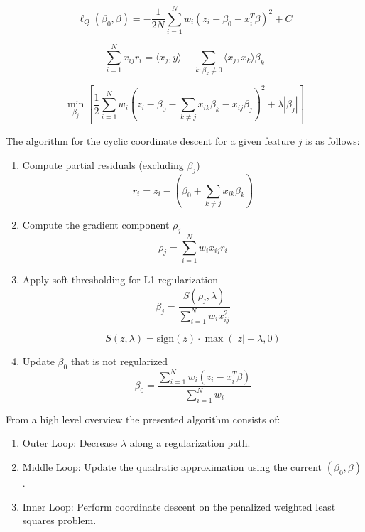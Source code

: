 \documentclass[12pt]{article}
\begin{document}
\begin{equation}\label{eq:quadratic-approximation}
\ell_Q(\beta_0, \beta) = -\frac{1}{2N} \sum_{i=1}^{N} w_i (z_i - \beta_0 - x_i^T \beta)^2 + C
\end{equation}


\begin{equation}\label{eq:covariance-update}
\sum_{i=1}^{N} x_{ij} r_i = \langle x_j, y \rangle - \sum_{k: \beta_k \neq 0} \langle x_j, x_k \rangle \beta_k
\end{equation}

\begin{equation}\label{eq:feature-minimization}
    \min_{\beta_j} \left[ \frac{1}{2} \sum_{i=1}^{N} w_i \left( z_i - \beta_0 - \sum_{k \neq j} x_{ik} \beta_k - x_{ij} \beta_j \right)^2 + \lambda |\beta_j| \right]
\end{equation}


The algorithm for the cyclic coordinate descent for a given feature $j$ is as follows:
\begin{enumerate}
    \item Compute partial residuals (excluding $\beta_j$)
    $$
    r_i = z_i - (\beta_0 + \sum_{k \neq j} x_{ik} \beta_k)
    $$
    \item Compute the gradient component $\rho_j$
    $$
    \rho_j = \sum_{i=1}^{N} w_i x_{ij} r_i
    $$
    \item Apply soft-thresholding for L1 regularization
    $$
    \beta_j = \frac{S(\rho_j, \lambda)}{\sum_{i=1}^{N} w_i x_{ij}^2}
    $$
 
    $$
    S(z, \lambda) = \text{sign}(z) \cdot \max(|z| - \lambda, 0)
    $$
    \item Update $\beta_0$ that is not regularized
    $$
\beta_0 = \frac{\sum_{i=1}^{N} w_i (z_i - x_i^T \beta)}{\sum_{i=1}^{N} w_i}
$$

\end{enumerate}



From a high level overview the presented algorithm consists of:

\begin{enumerate}
    \item Outer Loop: Decrease $\lambda$ along a regularization path.
    \item Middle Loop: Update the quadratic approximation using the current $(\beta_0, \beta)$.
    \item Inner Loop: Perform coordinate descent on the penalized weighted least squares problem.
\end{enumerate}
\end{document}

